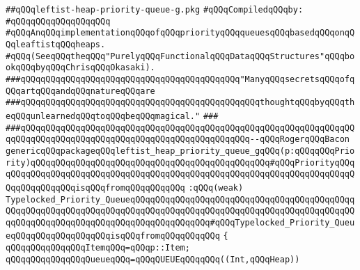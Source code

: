 \label{src/lib/src/leftist-heap-priority-queue-g.pkg}
\verb|##qQQqleftist-heap-priority-queue-g.pkg|\newline
\newline
\verb|#qQQqCompiledqQQqby:|\newline
\verb|#qQQqqQQqqQQqqQQqqQQq|\newline
\newline
\verb|#qQQqAnqQQqimplementationqQQqofqQQqpriorityqQQqqueuesqQQqbasedqQQqonqQQqleaftistqQQqheaps.|\newline
\verb|#qQQq(SeeqQQqtheqQQq"PurelyqQQqFunctionalqQQqDataqQQqStructures"qQQqbookqQQqbyqQQqChrisqQQqOkasaki).|\newline
\newline
\newline
\verb|###qQQqqQQqqQQqqQQqqQQqqQQqqQQqqQQqqQQqqQQqqQQq"ManyqQQqsecretsqQQqofqQQqartqQQqandqQQqnatureqQQqare|\newline
\verb|###qQQqqQQqqQQqqQQqqQQqqQQqqQQqqQQqqQQqqQQqqQQqqQQqthoughtqQQqbyqQQqtheqQQqunlearnedqQQqtoqQQqbeqQQqmagical."|\newline
\verb|###|\newline
\verb|###qQQqqQQqqQQqqQQqqQQqqQQqqQQqqQQqqQQqqQQqqQQqqQQqqQQqqQQqqQQqqQQqqQQqqQQqqQQqqQQqqQQqqQQqqQQqqQQqqQQqqQQqqQQqqQQqqQQq--qQQqRogerqQQqBacon|\newline
\newline
\newline
\verb|genericqQQqpackageqQQqleftist_heap_priority_queue_gqQQq(p:qQQqqQQqPriority)qQQqqQQqqQQqqQQqqQQqqQQqqQQqqQQqqQQqqQQqqQQqqQQq#qQQqPriorityqQQqqQQqqQQqqQQqqQQqqQQqqQQqqQQqqQQqqQQqqQQqqQQqqQQqqQQqqQQqqQQqqQQqqQQqqQQqqQQqqQQqqQQqisqQQqfromqQQqqQQqqQQq|\newline
\verb|:qQQq(weak)|\newline
\verb|Typelocked_Priority_QueueqQQqqQQqqQQqqQQqqQQqqQQqqQQqqQQqqQQqqQQqqQQqqQQqqQQqqQQqqQQqqQQqqQQqqQQqqQQqqQQqqQQqqQQqqQQqqQQqqQQqqQQqqQQqqQQqqQQqqQQqqQQqqQQqqQQqqQQqqQQqqQQqqQQqqQQqqQQq#qQQqTypelocked_Priority_QueueqQQqqQQqqQQqqQQqqQQqisqQQqfromqQQqqQQqqQQq|\newline
\verb|{|\newline
\verb|qQQqqQQqqQQqqQQqItemqQQq=qQQqp::Item;|\newline
\newline
\verb|qQQqqQQqqQQqqQQqQueueqQQq=qQQqQUEUEqQQqqQQq((Int,qQQqHeap))|\newline
